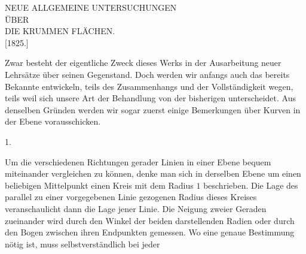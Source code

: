 \clearpage
{}%
\begin{center}\large NEUE ALLGEMEINE UNTERSUCHUNGEN\\[4pt] ÜBER\\[4pt] DIE KRUMMEN FLÄCHEN.\\[7pt] [1825.]\end{center}
\noindent\hspace*{1.2em}Zwar besteht der eigentliche Zweck dieses Werks in der Ausarbeitung neuer Lehrsätze über seinen Gegenstand. Doch werden wir anfangs auch das bereits Bekannte entwickeln, teils des Zusammenhangs und der Vollständigkeit wegen, teils weil sich unsere Art der Behandlung von der bisherigen unterscheidet. Aus denselben Gründen werden wir sogar zuerst einige Bemerkungen über Kurven in der Ebene vorausschicken.

\begin{center}1.\end{center}
\noindent\hspace*{1.2em}Um die verschiedenen Richtungen gerader Linien in einer Ebene bequem miteinander vergleichen zu können, denke man sich in derselben Ebene um einen beliebigen Mittelpunkt einen Kreis mit dem Radius $1$ beschrieben. Die Lage des parallel zu einer vorgegebenen Linie gezogenen Radius dieses Kreises veranschaulicht dann die Lage jener Linie. Die Neigung zweier Geraden zueinander wird durch den Winkel der beiden darstellenden Radien oder durch den Bogen zwischen ihren Endpunkten gemessen. Wo eine genaue Bestimmung nötig ist, muss selbstverständlich bei jeder\space%
